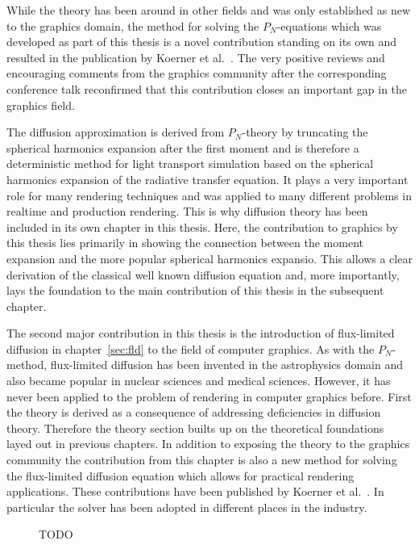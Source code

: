 While the theory has been around in other fields and was only established as new to the graphics domain, the method for solving the $P_N$-equations which was developed as part of this thesis is a novel contribution standing on its own and resulted in the publication by Koerner et al.~\cite{Koerner18}. The very positive reviews and encouraging comments from the graphics community after the corresponding conference talk reconfirmed that this contribution closes an important gap in the graphics field.

The diffusion approximation is derived from $P_N$-theory by truncating the spherical harmonics expansion after the first moment and is therefore a deterministic method for light transport simulation based on the spherical harmonics expansion of the radiative transfer equation. It plays a very important role for many rendering techniques and was applied to many different problems in realtime and production rendering. This is why diffusion theory has been included in its own chapter in this thesis. Here, the contribution to graphics by this thesis lies primarily in showing the connection between the moment expansion and the more popular spherical harmonics expansio. This allows a clear derivation of the classical well known diffusion equation and, more importantly, lays the foundation to the main contribution of this thesis in the subsequent chapter.

The second major contribution in this thesis is the introduction of flux-limited diffusion in chapter~\ref{sec:fld} to the field of computer graphics. As with the $P_N$-method, flux-limited diffusion has been invented in the astrophysics domain and also became popular in nuclear sciences and medical sciences.  However, it has never been applied to the problem of rendering in computer graphics before. First the theory is derived as a consequence of addressing deficiencies in diffusion theory. Therefore the theory section builts up on the theoretical foundations layed out in previous chapters. In addition to exposing the theory to the graphics community the contribution from this chapter is also a new method for solving the flux-limited diffusion equation which allows for practical rendering applications. These contributions have been published by Koerner et al.~\cite{Koerner14}. In particular the solver has been adopted in different places in the industry.
\begin{figure}[h]
\centering
{}
\caption{TODO}
\label{fig:fld_conclusion_elementacular_1}
\end{figure}

